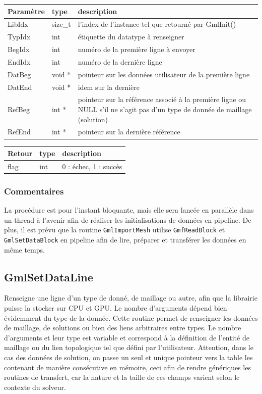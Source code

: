 \documentclass[a4paper,12pt]{article}
\begin{document}
\begin{tabular}{|m{2cm}|m{1.5cm}|m{10.5cm}|}
\hline
Paramètre  & type    & description \\
\hline
LibIdx     & size\_t & l'index de l'instance tel que retourné par GmlInit() \\
\hline
TypIdx     & int     & étiquette du datatype à renseigner \\
\hline
BegIdx     & int     & numéro de la première ligne à envoyer \\
\hline
EndIdx     & int     & numéro de la dernière ligne  \\
\hline
DatBeg     & void *  & pointeur sur les données utilisateur de la première ligne \\
\hline
DatEnd     & void *  & idem sur la dernière \\
\hline
RefBeg     & int *   & pointeur sur la référence associé à la première ligne ou NULL s'il ne s'agit pas d'un type de donnée de maillage (solution) \\
\hline
RefEnd     & int *   & pointeur sur la dernière référence \\
\hline
\end{tabular}

\medskip

\begin{tabular}{|m{2cm}|m{1.5cm}|m{10.5cm}|}
\hline
Retour     & type   & description \\
\hline
flag       & int    & 0 : échec, 1 : succès \\
\hline
\end{tabular}

\subsubsection*{Commentaires}
La procédure est pour l'instant bloquante, mais elle sera lancée en parallèle dans un thread à l'avenir afin de réaliser les initialisations de données en pipeline.
De plus, il est prévu que la routine {\tt GmlImportMesh} utilise {\tt GmfReadBlock} et {\tt GmlSetDataBlock} en pipeline afin de lire, préparer et transférer les données en même temps.



\subsection{GmlSetDataLine}

Renseigne une ligne d'un type de donné, de maillage ou autre, afin que la librairie puisse la stocker sur CPU et GPU.
Le nombre d'arguments dépend bien évidemment du type de la donnée.
Cette routine permet de renseigner les données de maillage, de solutions ou bien des liens arbitraires entre types.
Le nombre d'arguments et leur type est variable et correspond à la définition de l'entité de maillage ou du lien topologique tel que défini par l'utilisateur.
Attention, dans le cas des données de solution, on passe un seul et unique pointeur vers la table les contenant de manière consécutive en mémoire, ceci afin de rendre génériques les routines de transfert, car la nature et la taille de ces champs varient selon le contexte du solveur.
\end{document}
